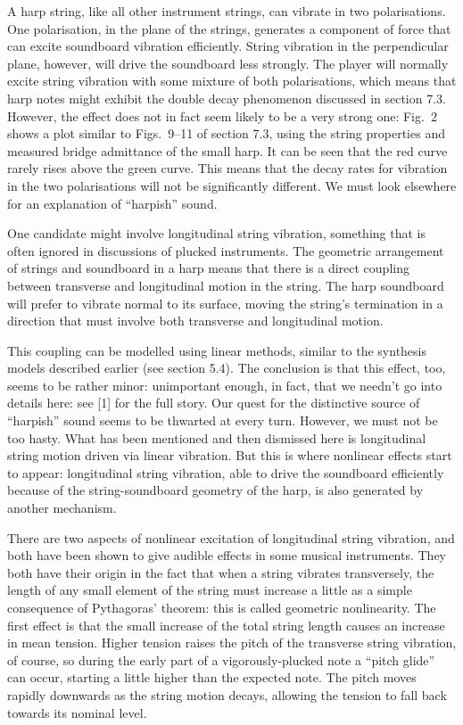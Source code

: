   A harp string, like all other instrument strings, can vibrate in two 
  polarisations. One polarisation, in the plane of the strings, generates a 
  component of force that can excite soundboard vibration efficiently. String 
  vibration in the perpendicular plane, however, will drive the soundboard less 
  strongly. The player will normally excite string vibration with some mixture 
  of both polarisations, which means that harp notes might exhibit the double 
  decay phenomenon discussed in section 7.3. However, the effect does not in 
  fact seem likely to be a very strong one: Fig.\ 2 shows a plot similar to 
  Figs.\ 9--11 of section 7.3, using the string properties and measured bridge 
  admittance of the small harp. It can be seen that the red curve rarely rises 
  above the green curve. This means that the decay rates for vibration in the 
  two polarisations will not be significantly different. We must look elsewhere 
  for an explanation of ``harpish'' sound. 

  One candidate might involve longitudinal string vibration, something that is 
  often ignored in discussions of plucked instruments. The geometric 
  arrangement of strings and soundboard in a harp means that there is a direct 
  coupling between transverse and longitudinal motion in the string. The harp 
  soundboard will prefer to vibrate normal to its surface, moving the string's 
  termination in a direction that must involve both transverse and longitudinal 
  motion. 

  This coupling can be modelled using linear methods, similar to the synthesis 
  models described earlier (see section 5.4). The conclusion is that this 
  effect, too, seems to be rather minor: unimportant enough, in fact, that we 
  needn't go into details here: see [1] for the full story. Our quest for the 
  distinctive source of ``harpish'' sound seems to be thwarted at every turn. 
  However, we must not be too hasty. What has been mentioned and then dismissed 
  here is longitudinal string motion driven via linear vibration. But this is 
  where nonlinear effects start to appear: longitudinal string vibration, able 
  to drive the soundboard efficiently because of the string-soundboard geometry 
  of the harp, is also generated by another mechanism. 

  There are two aspects of nonlinear excitation of longitudinal string 
  vibration, and both have been shown to give audible effects in some musical 
  instruments. They both have their origin in the fact that when a string 
  vibrates transversely, the length of any small element of the string must 
  increase a little as a simple consequence of Pythagoras’ theorem: this is 
  called geometric nonlinearity. The first effect is that the small increase of 
  the total string length causes an increase in mean tension. Higher tension 
  raises the pitch of the transverse string vibration, of course, so during the 
  early part of a vigorously-plucked note a “pitch glide” can occur, starting a 
  little higher than the expected note. The pitch moves rapidly downwards as 
  the string motion decays, allowing the tension to fall back towards its 
  nominal level. 

